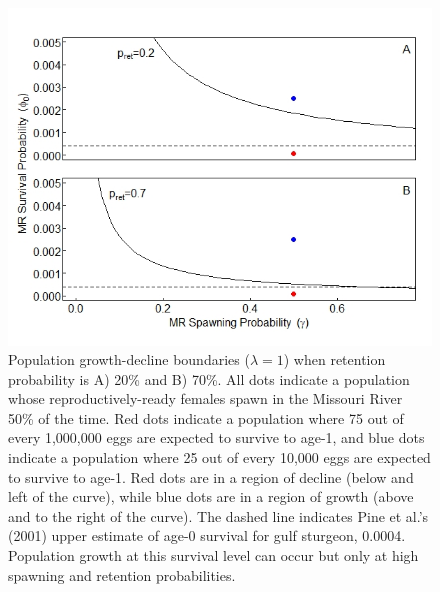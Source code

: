 \documentclass[12pt]{article}
\begin{document}
\begin{figure}[h]
\centering
\includegraphics[width=6in]{NEPA_Fig_8-boundary-example}
\caption{Population growth-decline boundaries ($\lambda=1$) when retention probability is A) 20\% and B) 70\%.  All dots indicate a population whose reproductively-ready females spawn in the Missouri River 50\% of the time.  Red dots indicate a population where 75 out of every 1,000,000 eggs are expected to survive to age-1, and blue dots indicate a population where 25 out of every 10,000 eggs are expected to survive to age-1.  Red dots are in a region of decline (below and left of the curve), while blue dots are in a region of growth (above and to the right of the curve).  The dashed line indicates Pine et al.'s (2001) upper estimate of age-0 survival for gulf sturgeon, 0.0004.  Population growth at this survival level can occur but only at high spawning and retention probabilities.}
\label{boundaryEx}
\end{figure}
\end{document}

